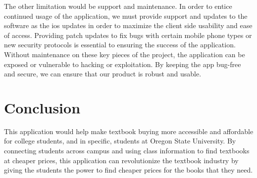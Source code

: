 \documentclass[12pt]{article}
\begin{document}
The other limitation would be support and maintenance. In order to entice continued usage of the application, we must provide support and updates to the software as the ios updates in order to maximize the client side usability and ease of access. Providing patch updates to fix bugs with certain mobile phone types or new security protocols is essential to ensuring the success of the application. Without maintenance on these key pieces of the project, the application can be exposed or vulnerable to hacking or exploitation. By keeping the app bug-free and secure, we can ensure that our product is robust and usable.

\section{Conclusion}
This application would help make textbook buying more accessible and affordable for college students, and in specific, students at Oregon State University. By connecting students across campus and using class information to find textbooks at cheaper prices, this application can revolutionize the textbook industry by giving the students the power to find cheaper prices for the books that they need.




\end{document}
